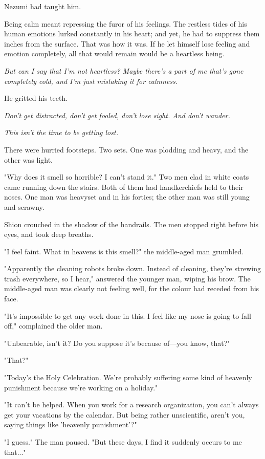 Nezumi had taught him.

Being calm meant repressing the furor of his feelings. The restless
tides of his human emotions lurked constantly in his heart; and yet, he
had to suppress them inches from the surface. That was how it was. If he
let himself lose feeling and emotion completely, all that would remain
would be a heartless being.

\emph{But can I say that I'm not heartless? Maybe there's a part of me that's
gone completely cold, and I'm just mistaking it for calmness.}

He gritted his teeth.

\emph{Don't get distracted, don't get fooled, don't lose sight. And don't
wander.}

\emph{This isn't the time to be getting lost.}

There were hurried footsteps. Two sets. One was plodding and heavy, and
the other was light.

"Why does it smell so horrible? I can't stand it." Two men clad in white
coats came running down the stairs. Both of them had handkerchiefs held
to their noses. One man was heavyset and in his forties; the other man
was still young and scrawny.

Shion crouched in the shadow of the handrails. The men stopped right
before his eyes, and took deep breaths.

"I feel faint. What in heavens is this smell?" the middle-aged man
grumbled.

"Apparently the cleaning robots broke down. Instead of cleaning, they're
strewing trash everywhere, so I hear," answered the younger man, wiping
his brow. The middle-aged man was clearly not feeling well, for the
colour had receded from his face.

"It's impossible to get any work done in this. I feel like my nose is
going to fall off," complained the older man.

"Unbearable, isn't it? Do you suppose it's because of---you know, that?"

"That?"

"Today's the Holy Celebration. We're probably suffering some kind of
heavenly punishment because we're working on a holiday."

"It can't be helped. When you work for a research organization, you
can't always get your vacations by the calendar. But being rather
unscientific, aren't you, saying things like 'heavenly punishment'?"

"I guess." The man paused. "But these days, I find it suddenly occurs to
me that..."

